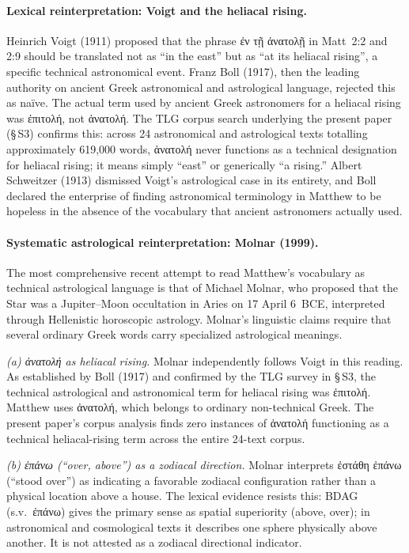\documentclass[11pt,a4paper]{article}
\newcommand{\grk}[1]{{\fontencoding{LGR}\selectfont #1}}
\newcommand{\grk}[1]{{\greekfont #1}}
\begin{document}
\paragraph{Lexical reinterpretation: Voigt and the heliacal rising.}
Heinrich Voigt (1911) proposed that the phrase \grk{ἐν τῇ ἀνατολῇ} in Matt~2:2 and 2:9
should be translated not as ``in the east'' but as ``at its heliacal rising'', a specific
technical astronomical event. Franz Boll (1917)\cite{boll1917}, then the leading authority
on ancient Greek astronomical and astrological language, rejected this as na\"{i}ve. The
actual term used by ancient Greek astronomers for a heliacal rising was \grk{ἐπιτολή}, not
\grk{ἀνατολή}. The TLG corpus search underlying the present paper (§\,S3) confirms this:
across 24 astronomical and astrological texts totalling approximately 619,000 words, \grk{ἀνατολή}
never functions as a technical designation for heliacal rising; it means simply ``east'' or
generically ``a rising.'' Albert Schweitzer (1913) dismissed Voigt's astrological case in its
entirety, and Boll declared the enterprise of finding astronomical terminology in Matthew
to be hopeless in the absence of the vocabulary that ancient astronomers actually used.

\paragraph{Systematic astrological reinterpretation: Molnar (1999).}
The most comprehensive recent attempt to read Matthew's vocabulary as technical astrological
language is that of Michael Molnar\cite{molnar1999}, who proposed that the Star was a
Jupiter--Moon occultation in Aries on 17 April 6~BCE, interpreted through Hellenistic
horoscopic astrology. Molnar's linguistic claims require that several ordinary Greek words
carry specialized astrological meanings.

\textit{(a) \grk{ἀνατολή} as heliacal rising.} Molnar independently follows Voigt in this reading.
As established by Boll (1917)\cite{boll1917} and confirmed by the TLG survey in §\,S3,
the technical astrological and astronomical term for heliacal rising was \grk{ἐπιτολή}.
Matthew uses \grk{ἀνατολή}, which belongs to ordinary non-technical Greek.
The present paper's corpus analysis finds zero instances of \grk{ἀνατολή} functioning
as a technical heliacal-rising term across the entire 24-text corpus.

\textit{(b) \grk{ἐπάνω} (``over, above'') as a zodiacal direction.}  Molnar interprets
\grk{ἐστάθη ἐπάνω} (``stood over'') as indicating a favorable zodiacal configuration
rather than a physical location above a house. The lexical evidence resists this:
BDAG (s.v.\ \grk{ἐπάνω})\cite{bdag2000} gives the primary sense as spatial superiority
(above, over); in astronomical and cosmological texts it describes one sphere physically
above another. It is not attested as a zodiacal directional indicator.
\end{document}
